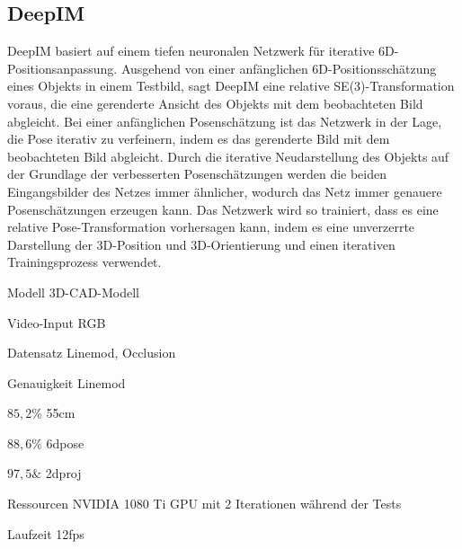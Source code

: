\documentclass[a4paper, 11pt]{article}
\begin{document}
\begin{multicols*}{2}
    \columnbreak
    \subsection{DeepIM}
    DeepIM\cite{Deepim} basiert auf einem tiefen neuronalen Netzwerk für iterative 6D-Positionsanpassung. Ausgehend von einer anfänglichen 6D-Positionsschätzung eines Objekts in einem Testbild, sagt DeepIM eine relative SE(3)-Transformation voraus, die eine gerenderte Ansicht des Objekts mit dem beobachteten Bild abgleicht.  Bei einer anfänglichen Posenschätzung ist das Netzwerk in der Lage, die Pose iterativ zu verfeinern, indem es das gerenderte Bild mit dem beobachteten Bild abgleicht. Durch die iterative Neudarstellung des Objekts auf der Grundlage der verbesserten Posenschätzungen werden die beiden Eingangsbilder des Netzes immer ähnlicher, wodurch das Netz immer genauere Posenschätzungen erzeugen kann.
    Das Netzwerk wird so trainiert, dass es eine relative Pose-Transformation vorhersagen kann, indem es eine unverzerrte Darstellung der 3D-Position und 3D-Orientierung und einen iterativen Trainingsprozess verwendet.
    \begin{description*}
        \item[Modell] 3D-CAD-Modell
        \item[Video-Input] RGB
        \item[Datensatz] \Gls{Linemod}, \Gls{Occlusion}
        \item[Genauigkeit] \Gls{Linemod}
        \begin{itemize*}
            \item $85,2\%$ \Gls{55cm}
            \item $88,6\%$ \Gls{6dpose}
            \item $97,5\&$ \Gls{2dproj}
        \end{itemize*}
        \item[Ressourcen] NVIDIA 1080 Ti GPU mit 2 Iterationen während der Tests
        \item[Laufzeit] 12fps
    \end{description*}


\end{multicols*}
\end{document}
